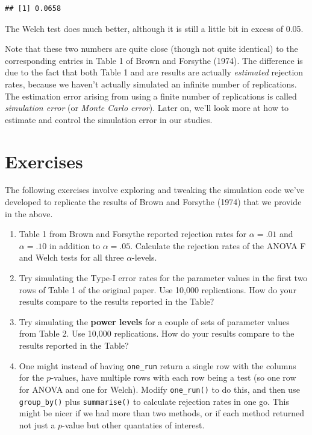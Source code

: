 \documentclass[
]{book}
\begin{document}
\begin{verbatim}
## [1] 0.0658
\end{verbatim}

The Welch test does much better, although it is still a little bit in excess of 0.05.

Note that these two numbers are quite close (though not quite identical) to the corresponding entries in Table 1 of Brown and Forsythe (1974). The difference is due to the fact that both Table 1 and are results are actually \emph{estimated} rejection rates, because we haven't actually simulated an infinite number of replications. The estimation error arising from using a finite number of replications is called \emph{simulation error} (or \emph{Monte Carlo error}).
Later on, we'll look more at how to estimate and control the simulation error in our studies.

\hypertarget{exAnovaExercises}{%
\section{Exercises}\label{exAnovaExercises}}

The following exercises involve exploring and tweaking the simulation code we've developed to replicate the results of Brown and Forsythe (1974) that we provide in the above.

\begin{enumerate}
\def\labelenumi{\arabic{enumi}.}
\item
  Table 1 from Brown and Forsythe reported rejection rates for \(\alpha = .01\) and \(\alpha = .10\) in addition to \(\alpha = .05\). Calculate the rejection rates of the ANOVA F and Welch tests for all three \(\alpha\)-levels.
\item
  Try simulating the Type-I error rates for the parameter values in the first two rows of Table 1 of the original paper. Use 10,000 replications. How do your results compare to the results reported in the Table?
\item
  Try simulating the \textbf{power levels} for a couple of sets of parameter values from Table 2. Use 10,000 replications. How do your results compare to the results reported in the Table?
\item
  One might instead of having \texttt{one\_run} return a single row with the columns for the \(p\)-values, have multiple rows with each row being a test (so one row for ANOVA and one for Welch). Modify \texttt{one\_run()} to do this, and then use \texttt{group\_by()} plus \texttt{summarise()} to calculate rejection rates in one go. This might be nicer if we had more than two methods, or if each method returned not just a \(p\)-value but other quantaties of interest.
\end{enumerate}
\end{document}
